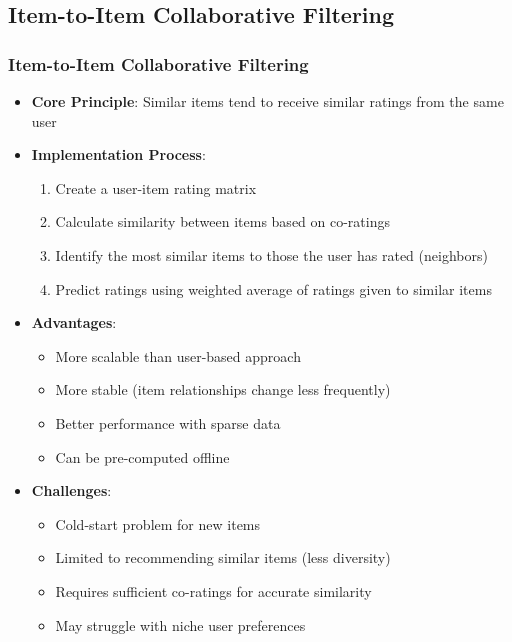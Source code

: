 \documentclass{beamer}
\begin{document}
\subsection{Item-to-Item Collaborative Filtering}
\begin{frame}
\frametitle{Item-to-Item Collaborative Filtering}
\begin{itemize}
    \item \textbf{Core Principle}: Similar items tend to receive similar ratings from the same user
    
    \item \textbf{Implementation Process}:
    \begin{enumerate}
        \item Create a user-item rating matrix
        \item Calculate similarity between items based on co-ratings
        \item Identify the most similar items to those the user has rated (neighbors)
        \item Predict ratings using weighted average of ratings given to similar items
    \end{enumerate}
    
    \item \textbf{Advantages}:
    \begin{itemize}
        \item More scalable than user-based approach
        \item More stable (item relationships change less frequently)
        \item Better performance with sparse data
        \item Can be pre-computed offline
    \end{itemize}
    
    \item \textbf{Challenges}:
    \begin{itemize}
        \item Cold-start problem for new items
        \item Limited to recommending similar items (less diversity)
        \item Requires sufficient co-ratings for accurate similarity
        \item May struggle with niche user preferences
    \end{itemize}
\end{itemize}
\end{frame}
\end{document}

